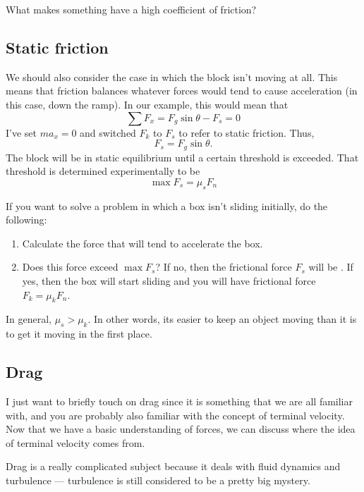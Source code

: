 What makes something have a high coefficient of friction?

\subsection{Static friction}
We should also consider the case in which the block isn't moving at all. This means that friction balances whatever forces would tend to cause acceleration (in this case, down the ramp). In our example, this would mean that
$$\sum F_x=F_g\sin\theta-F_s=0$$
I've set $ma_x=0$ and switched $F_k$ to $F_s$ to refer to static friction. Thus,
$$F_s=F_g\sin\theta.$$
The block will be in static equilibrium until a certain threshold is exceeded. That threshold is determined experimentally to be
$$\boxed{\max F_s=\mu_s F_n}$$

If you want to solve a problem in which a box isn't sliding initially, do the following:
\begin{enumerate}
\item Calculate the force that will tend to accelerate the box.
\item Does this force exceed $\max F_s$? If no, then the frictional force $F_s$ will be . If yes, then the box will start sliding and you will have frictional force $F_k=\mu_k F_n$.
\end{enumerate}
In general, $\mu_s>\mu_k$. In other words, its easier to keep an object moving than it is to get it moving in the first place.

\subsection{Drag}
I just want to briefly touch on drag since it is something that we are all familiar with, and you are probably also familiar with the concept of terminal velocity. Now that we have a basic understanding of forces, we can discuss where the idea of terminal velocity comes from.

Drag is a really complicated subject because it deals with fluid dynamics and turbulence --- turbulence is still considered to be a pretty big mystery.

